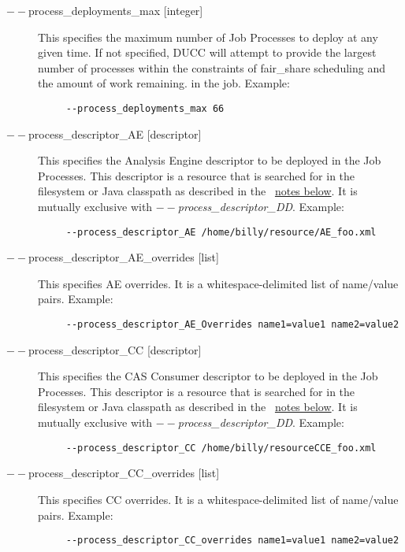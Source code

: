 \begin{description}
           \item[$--$process\_deployments\_max {[integer]} ]
             This specifies the maximum number of Job Processes to deploy at any given time. If not 
             specified, DUCC will attempt to provide the largest number of processes within the 
             constraints of fair\_share scheduling and the amount of work remaining.
             in the job. Example:
             \begin{verbatim}
     --process_deployments_max 66
             \end{verbatim}

           \item[$--$process\_descriptor\_AE {[descriptor]}  ]
             This specifies the Analysis Engine descriptor to be deployed in the Job Processes. This 
             descriptor is a resource that is searched for in the filesystem or Java classpath as described 
             in the ~\hyperref[par:cli.submit.notes]{notes below}.
             It is mutually exclusive with {\em $--$process\_descriptor\_DD}.
             Example: 
             \begin{verbatim}
     --process_descriptor_AE /home/billy/resource/AE_foo.xml
             \end{verbatim}


           \item[$--$process\_descriptor\_AE\_overrides {[list]}  ]
             This specifies AE overrides. It is a whitespace-delimited list of name/value pairs. Example: 
             \begin{verbatim}
     --process_descriptor_AE_Overrides name1=value1 name2=value2
             \end{verbatim}

           \item[$--$process\_descriptor\_CC {[descriptor]}  ]
             This specifies the CAS Consumer descriptor to be deployed in the Job Processes. This 
             descriptor is a resource that is searched for in the filesystem or Java classpath as described 
             in the ~\hyperref[par:cli.submit.notes]{notes below}.
             It is mutually exclusive with {\em $--$process\_descriptor\_DD}.
             Example: 
             \begin{verbatim}
     --process_descriptor_CC /home/billy/resourceCCE_foo.xml
             \end{verbatim}

           \item[$--$process\_descriptor\_CC\_overrides {[list]}  ]
             This specifies CC overrides. It is a whitespace-delimited list of name/value pairs. Example: 
             \begin{verbatim}
     --process_descriptor_CC_overrides name1=value1 name2=value2
             \end{verbatim}
           

\end{description}
